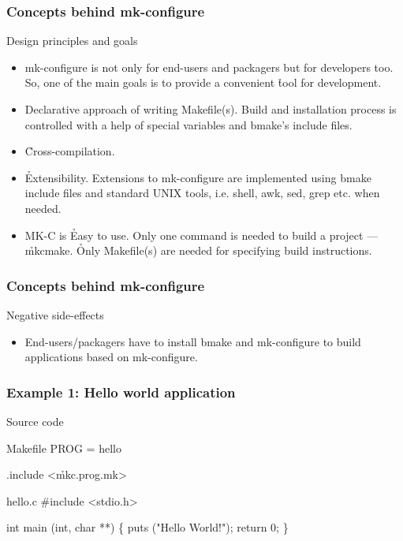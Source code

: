 \documentclass[hyperref={colorlinks=true}]{beamer}
\begin{document}
\begin{frame}
  \frametitle{Concepts behind mk-configure}
  \begin{block}{Design principles and goals}
    \begin{itemize}
    \item mk-configure is not only for end-users and packagers
      but for developers too.
      So, one of the main goals is to provide a convenient \h{tool for
        development}.
    \item Declarative approach of writing Makefile(s). Build and
      installation process is controlled with a help of special
      variables and bmake's include files.
    \item \h{Cross-compilation}.
    \item \h{Extensibility}. Extensions to mk-configure are implemented
      using bmake include files and standard UNIX tools, i.e. shell,
      awk, sed, grep etc. when needed.
    \item MK-C is \h{Easy to use}. Only one command is needed to build
      a project --- \h{mkcmake}.  \h{Only Makefile(s)} are needed for
      specifying build instructions.
    \end{itemize}
  \end{block}
\end{frame}

\begin{frame}
  \frametitle{Concepts behind mk-configure}
  \begin{block}{Negative side-effects}
    \begin{itemize}
    \item End-users/packagers have to install bmake and
      mk-configure to build applications based on mk-configure.
    \end{itemize}
  \end{block}
\end{frame}

\begin{frame}[fragile]
  \frametitle{Example 1: Hello world application}

  \begin{block}{Source code}
      \begin{Code}{Makefile}
PROG =      hello

.include <\h{mkc.prog.mk}>
      \end{Code}
      \begin{Code}{hello.c}
#include <stdio.h>

int main (int, char **)
\{
   puts ("Hello World!");
   return 0;
\}
      \end{Code}
  \end{block}
\end{frame}
\end{document}
